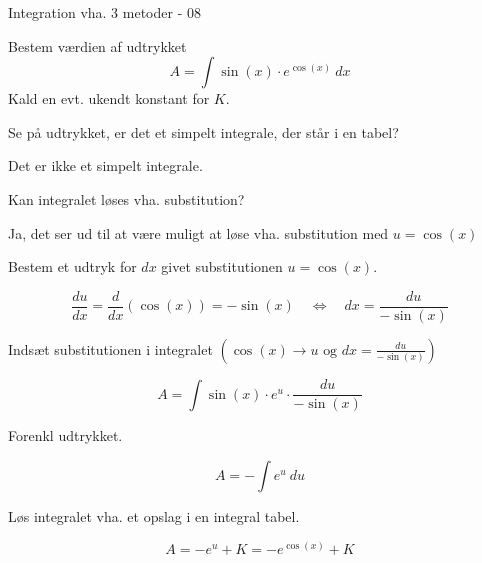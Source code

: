 \documentclass{article}
\begin{document}
\begin{exercise}{Integration vha. 3 metoder - 08}
	
	Bestem værdien af udtrykket
	\[
	A = \int \sin(x) \cdot e^{\cos(x)} \ dx
	\]
	Kald en evt. ukendt konstant for $K$.
	
	
	\hint
	Se på udtrykket, er det et simpelt integrale, der står i en tabel?
	
	\hint
	Det er ikke et simpelt integrale.
	
	\hint
	Kan integralet løses vha. substitution?
	
	\hint
	Ja, det ser ud til at være muligt at løse vha. substitution med $u=\cos(x)$
	
	\hint
	Bestem et udtryk for $dx$ givet substitutionen $u=\cos(x)$.
	
	\hint
	\[
	\frac{du}{dx} = \frac{d}{dx} \left(\cos(x) \right) = -\sin(x) \quad \Leftrightarrow \quad dx = \frac{du}{-\sin(x)}
	\]
	
	\hint
	Indsæt substitutionen i integralet $\left(\cos(x) \rightarrow u \textrm{ og } dx = \frac{du}{-\sin(x)} \right)$
	
	\hint
	\[
	A =  \int \sin(x) \cdot e^{u} \cdot \frac{du}{-\sin(x)}
	\]
	
	\hint
	Forenkl udtrykket.
	
	\hint
	\[
	A=  - \int e^{u} \ du
	\]
	
	\hint
	Løs integralet vha. et opslag i en integral tabel.
	
	\hint
	\[
	A = - e^{u} + K = -e^{\cos(x)} + K
	\]
	
	
\end{exercise}
\end{document}
